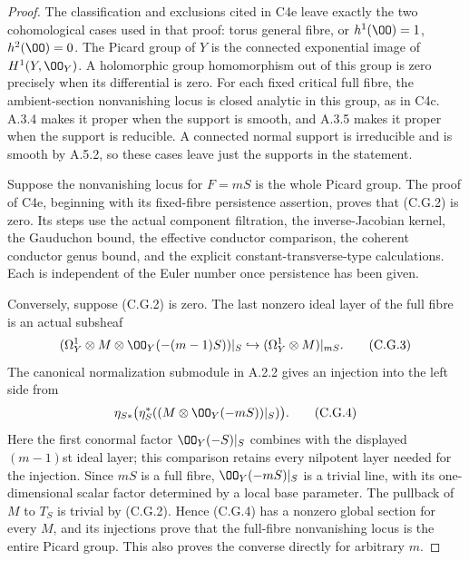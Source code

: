 \begin{proof}
The classification and exclusions cited in C4e leave
exactly the two cohomological cases used in that proof:
torus general fibre, or $h^1(\OO)=1$, $h^2(\OO)=0$.
The Picard group of $Y$ is the connected exponential image
of $H^1(Y,\OO_Y)$. A holomorphic group homomorphism out of
this group is zero precisely when its differential is zero.
For each fixed critical full fibre, the ambient-section
nonvanishing locus is closed analytic in this group, as
in C4c. A.3.4 makes it proper when the support is smooth,
and A.3.5 makes it proper when the support is reducible.
A connected normal support is irreducible and is smooth
by A.5.2, so these cases leave just the supports in the
statement.

Suppose the nonvanishing locus for $F=mS$ is the whole
Picard group. The proof of C4e, beginning with its
fixed-fibre persistence assertion, proves that (C.G.2)
is zero. Its steps use the actual component filtration,
the inverse-Jacobian kernel, the Gauduchon bound, the
effective conductor comparison, the coherent conductor
genus bound, and the explicit constant-transverse-type
calculations. Each is independent of the Euler number
once persistence has been given.

Conversely, suppose (C.G.2) is zero. The last nonzero
ideal layer of the full fibre is an actual subsheaf
\[
 (\Omega_Y^1\otimes M\otimes\OO_Y(-(m-1)S))|_S
 \hookrightarrow
          (\Omega_Y^1\otimes M)|_{mS}.
 \tag{C.G.3}
\]
The canonical normalization submodule in A.2.2 gives
an injection into the left side from
\[
 \eta_{S*}\bigl(\eta_S^*((M\otimes\OO_Y(-mS))|_S)\bigr).
 \tag{C.G.4}
\]
Here the first conormal factor $\OO_Y(-S)|_S$ combines
with the displayed $(m-1)$st ideal layer; this comparison
retains every nilpotent layer needed for the injection.
Since $mS$ is a full fibre, $\OO_Y(-mS)|_S$ is a trivial
line, with its one-dimensional scalar factor determined
by a local base parameter. The pullback of $M$ to $T_S$
is trivial by (C.G.2). Hence (C.G.4) has a nonzero global
section for every $M$, and its injections prove that the
full-fibre nonvanishing locus is the entire Picard group.
This also proves the converse directly for arbitrary $m$.


\end{proof}
